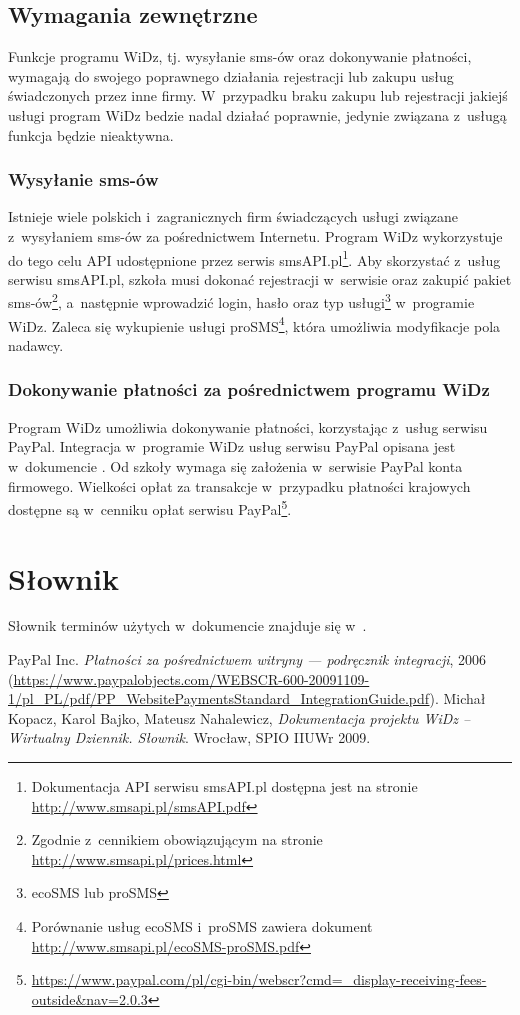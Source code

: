 \documentclass[12pt,leqno,twoside]{mwart}
\begin{document}
\subsection{Wymagania zewnętrzne}
\noindent Funkcje programu WiDz, tj. wysyłanie sms-ów oraz dokonywanie płatności, wymagają do swojego poprawnego działania rejestracji lub zakupu usług świadczonych przez inne firmy. W~przypadku braku zakupu lub rejestracji jakiejś usługi program WiDz bedzie nadal działać poprawnie, jedynie związana z~usługą funkcja będzie nieaktywna.

\subsubsection{Wysyłanie sms-ów}\label{WYSYLANIE_SMS}
\noindent Istnieje wiele polskich i~zagranicznych firm świadczących usługi związane z~wysyłaniem sms-ów za pośrednictwem Internetu. Program WiDz wykorzystuje do tego celu API udostępnione przez serwis smsAPI.pl\footnote{Dokumentacja API serwisu smsAPI.pl dostępna jest na stronie \url{http://www.smsapi.pl/smsAPI.pdf}}. Aby skorzystać z~usług serwisu smsAPI.pl, szkoła musi dokonać rejestracji w~serwisie oraz zakupić pakiet sms-ów\footnote{Zgodnie z~cennikiem obowiązującym na stronie \url{http://www.smsapi.pl/prices.html}}, a~następnie wprowadzić login, hasło oraz typ usługi\footnote{ecoSMS lub proSMS} w~programie WiDz. Zaleca się wykupienie usługi proSMS\footnote{Porównanie usług ecoSMS i~proSMS zawiera dokument \hbox{\url{http://www.smsapi.pl/ecoSMS-proSMS.pdf}}}, która umożliwia modyfikacje pola nadawcy.

\subsubsection{Dokonywanie płatności za pośrednictwem programu WiDz}\label{PLATNOSCI_WIDZ}
\noindent Program WiDz umożliwia dokonywanie płatności, korzystając z~usług serwisu PayPal. Integracja w~programie WiDz usług serwisu PayPal opisana jest w~dokumencie \cite{PAYPAL}. Od szkoły wymaga się założenia w~serwisie PayPal konta firmowego. Wielkości opłat za transakcje w~przypadku płatności krajowych dostępne są w~cenniku opłat serwisu PayPal\footnote{\url{https://www.paypal.com/pl/cgi-bin/webscr?cmd=_display-receiving-fees-outside&nav=2.0.3}}.

\section{Słownik}
\noindent Słownik terminów użytych w~dokumencie znajduje się w~\cite{SLO}.

\begin{thebibliography}{9}
	 PayPal Inc. {\it Płatności za pośrednictwem witryny — podręcznik integracji}, 2006 (\url{https://www.paypalobjects.com/WEBSCR-600-20091109-1/pl_PL/pdf/PP_WebsitePaymentsStandard_IntegrationGuide.pdf}).
	 Michał Kopacz, Karol Bajko, Mateusz Nahalewicz, {\it Dokumentacja projektu WiDz -- Wirtualny Dziennik. Słownik}. Wrocław, SPIO IIUWr 2009.
\end{thebibliography}
\end{document}

